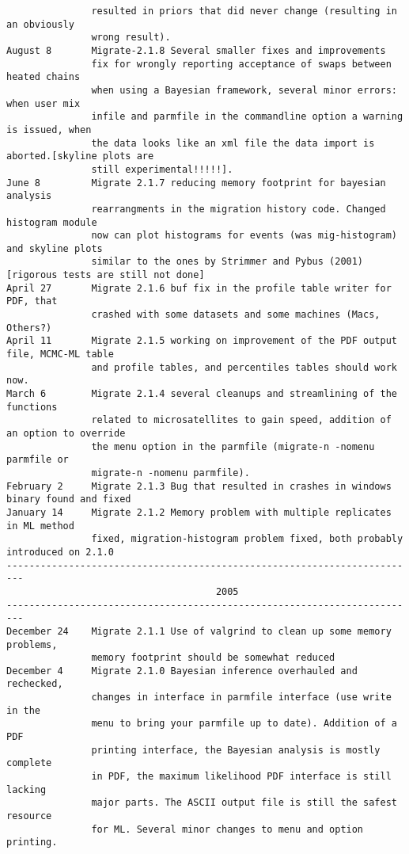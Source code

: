\begin{small}
\begin{verbatim}
               resulted in priors that did never change (resulting in an obviously 
               wrong result).
August 8       Migrate-2.1.8 Several smaller fixes and improvements
               fix for wrongly reporting acceptance of swaps between heated chains
               when using a Bayesian framework, several minor errors: when user mix 
               infile and parmfile in the commandline option a warning is issued, when 
               the data looks like an xml file the data import is aborted.[skyline plots are
               still experimental!!!!!].
June 8         Migrate 2.1.7 reducing memory footprint for bayesian analysis
               rearrangments in the migration history code. Changed histogram module
               now can plot histograms for events (was mig-histogram) and skyline plots
               similar to the ones by Strimmer and Pybus (2001)[rigorous tests are still not done]
April 27       Migrate 2.1.6 buf fix in the profile table writer for PDF, that
               crashed with some datasets and some machines (Macs, Others?)
April 11       Migrate 2.1.5 working on improvement of the PDF output file, MCMC-ML table 
               and profile tables, and percentiles tables should work now.
March 6        Migrate 2.1.4 several cleanups and streamlining of the functions
               related to microsatellites to gain speed, addition of an option to override 
               the menu option in the parmfile (migrate-n -nomenu parmfile or
               migrate-n -nomenu parmfile). 
February 2     Migrate 2.1.3 Bug that resulted in crashes in windows binary found and fixed
January 14     Migrate 2.1.2 Memory problem with multiple replicates in ML method
               fixed, migration-histogram problem fixed, both probably introduced on 2.1.0
-------------------------------------------------------------------------
                                     2005
-------------------------------------------------------------------------
December 24    Migrate 2.1.1 Use of valgrind to clean up some memory problems,
               memory footprint should be somewhat reduced
December 4     Migrate 2.1.0 Bayesian inference overhauled and rechecked,
               changes in interface in parmfile interface (use write in the
               menu to bring your parmfile up to date). Addition of a PDF
               printing interface, the Bayesian analysis is mostly complete
               in PDF, the maximum likelihood PDF interface is still lacking
               major parts. The ASCII output file is still the safest resource 
               for ML. Several minor changes to menu and option printing.

\end{verbatim}
\end{small}
